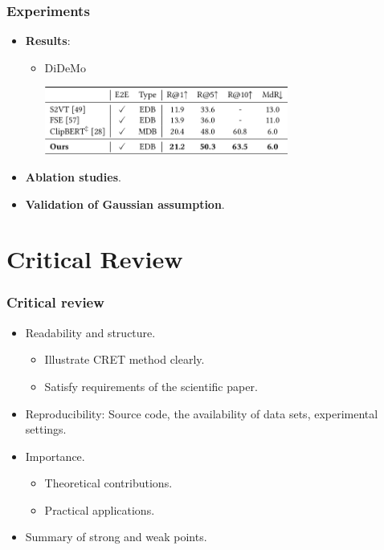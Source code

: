 \documentclass[notes, 10pt, aspectratio=169]{beamer}
\begin{document}
\begin{frame}
    \frametitle{Experiments}
    \begin{itemize}
        \item \textbf{Results}:
    \begin{itemize}
        \item DiDeMo
            \begin{center}
                \includegraphics[width=8cm]{didemo.png}
            \end{center}
    \end{itemize}
\item \textbf{Ablation studies}.
\item \textbf{Validation of Gaussian assumption}.
    \end{itemize}
\end{frame}

\section{Critical Review}
\begin{frame}
    \frametitle{Critical review} 
    \begin{itemize}
        \item Readability and structure.
            \begin{itemize}
                \item Illustrate CRET method clearly.
                \item Satisfy requirements of the scientific paper.
            \end{itemize}
        \item Reproducibility: Source code, the availability of data sets, experimental settings.
        \item Importance.
            \begin{itemize}
                \item Theoretical contributions.
                \item Practical applications.
            \end{itemize}
        \item Summary of strong and weak points.
    \end{itemize}
\end{frame}
\end{document}
